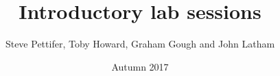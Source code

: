 \title{Introductory lab sessions}
\date{Autumn 2017}
\author{Steve Pettifer, Toby Howard, Graham Gough and John Latham}




\dominitoc
 





\setcounter{chapter}{-1}
\renewcommand{\chaptername}{Welcome Lab Session}

\renewcommand{\chaptername}{Intro Lab Session}






\printbibliography


